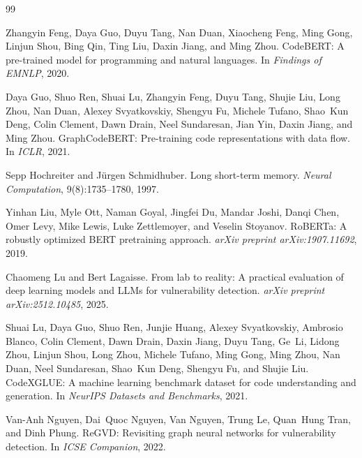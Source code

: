\documentclass{article}
\begin{document}
\raggedright

\begin{thebibliography}{99}

Zhangyin Feng, Daya Guo, Duyu Tang, Nan Duan, Xiaocheng Feng, Ming Gong, Linjun Shou, Bing Qin, Ting Liu, Daxin Jiang, and Ming Zhou.
\newblock CodeBERT: A pre-trained model for programming and natural languages.
\newblock In \emph{Findings of EMNLP}, 2020.

Daya Guo, Shuo Ren, Shuai Lu, Zhangyin Feng, Duyu Tang, Shujie Liu, Long Zhou, Nan Duan, Alexey Svyatkovskiy, Shengyu Fu, Michele Tufano, Shao~Kun Deng, Colin Clement, Dawn Drain, Neel Sundaresan, Jian Yin, Daxin Jiang, and Ming Zhou.
\newblock GraphCodeBERT: Pre-training code representations with data flow.
\newblock In \emph{ICLR}, 2021.

Sepp Hochreiter and J{\"u}rgen Schmidhuber.
\newblock Long short-term memory.
\newblock \emph{Neural Computation}, 9(8):1735--1780, 1997.

Yinhan Liu, Myle Ott, Naman Goyal, Jingfei Du, Mandar Joshi, Danqi Chen, Omer Levy, Mike Lewis, Luke Zettlemoyer, and Veselin Stoyanov.
\newblock RoBERTa: A robustly optimized BERT pretraining approach.
\newblock \emph{arXiv preprint arXiv:1907.11692}, 2019.

Chaomeng Lu and Bert Lagaisse.
\newblock From lab to reality: A practical evaluation of deep learning models and LLMs for vulnerability detection.
\newblock \emph{arXiv preprint arXiv:2512.10485}, 2025.

Shuai Lu, Daya Guo, Shuo Ren, Junjie Huang, Alexey Svyatkovskiy, Ambrosio Blanco, Colin Clement, Dawn Drain, Daxin Jiang, Duyu Tang, Ge~Li, Lidong Zhou, Linjun Shou, Long Zhou, Michele Tufano, Ming Gong, Ming Zhou, Nan Duan, Neel Sundaresan, Shao~Kun Deng, Shengyu Fu, and Shujie Liu.
\newblock CodeXGLUE: A machine learning benchmark dataset for code understanding and generation.
\newblock In \emph{NeurIPS Datasets and Benchmarks}, 2021.

Van-Anh Nguyen, Dai~Quoc Nguyen, Van Nguyen, Trung Le, Quan~Hung Tran, and Dinh Phung.
\newblock ReGVD: Revisiting graph neural networks for vulnerability detection.
\newblock In \emph{ICSE Companion}, 2022.


\end{thebibliography}
\end{document}
